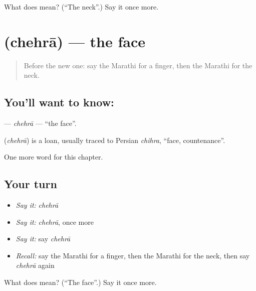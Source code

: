 \begin{tcolorbox}[breakable,colback=teal!4,colframe=teal!35!black,title={Before you move on}]
What does  mean? (\textquotedblleft{}The neck\textquotedblright{}.) Say it once more.
\end{tcolorbox}
\section[\texorpdfstring{\mr{चेहरा} (chehrā)}{चेहरा (chehrā)}]{ (chehrā) — the face}

\label{lesson:MR-C71-chehra}



\begin{quote}
Before the new one: say the Marathi for a finger, then the Marathi for the neck.
\end{quote}

\subsection*{You'll want to know: }
\textbf{} — \emph{chehrā} — \textquotedblleft{}the face\textquotedblright{}.

\begin{cousinweb}
\textbf{} (\emph{chehrā}) is a loan, usually traced to Persian \emph{chihra}, \textquotedblleft{}face, countenance\textquotedblright{}.
\end{cousinweb}

\begin{grammarlens}[title={What you've built}]
One more word for this chapter.
\end{grammarlens}

\subsection*{Your turn}
\begin{itemize}
\raggedright
  \item \emph{Say it:} \emph{chehrā}
  \item \emph{Say it:} \emph{chehrā}, once more
  \item \emph{Say it:} say \emph{chehrā}
  \item \emph{Recall:} say the Marathi for a finger, then the Marathi for the neck, then say \emph{chehrā} again
\end{itemize}

\begin{tcolorbox}[breakable,colback=teal!4,colframe=teal!35!black,title={Before you move on}]
What does  mean? (\textquotedblleft{}The face\textquotedblright{}.) Say it once more.
\end{tcolorbox}
